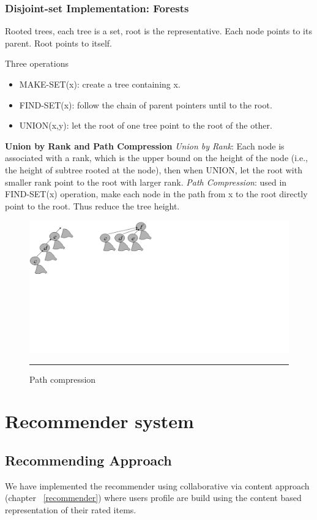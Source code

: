 \subsubsection{Disjoint-set Implementation: Forests}
Rooted trees, each tree is a set, root is the representative. Each node points to its parent. Root points to itself.

Three operations
\begin{itemize}
\item MAKE-SET(x): create a tree containing x.  
\item FIND-SET(x): follow the chain of parent pointers until to the root. 
\item UNION(x,y): let the root of one tree point to the root of the other.  
\end{itemize}

\textbf{Union by Rank and  Path Compression}
\textit{Union by Rank}: Each node is associated with a rank, which is the upper bound on the height of the node (i.e., the height of subtree rooted at the node), then when UNION, let the root with smaller rank point to the root with larger rank. 
\textit{Path Compression}: used in FIND-SET(x) operation, make each node in the path from x to the root  directly point to the root. Thus reduce the tree height.

\begin{figure}[htbp]
	\centering
		\includegraphics{./Figures/Mitosis_5.png}
		\rule{25em}{0.3pt}
	\caption[Path compression]{Path compression}
	\label{fig:mitosis_5}
\end{figure}




\section{Recommender system}
\subsection{Recommending Approach}
We have implemented the recommender using collaborative via content approach (chapter ~\ref{recommender}) where users profile are build using the content based representation of their rated items.

